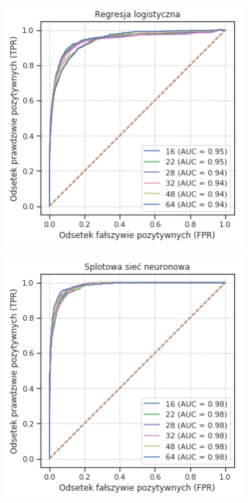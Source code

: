 \begin{figure}[h!]
  \centering
  \begin{subfigure}[b]{0.45\linewidth}
    \includegraphics[width=\linewidth]{images/logreg_patch_roc_v2}
  \end{subfigure}
  \begin{subfigure}[b]{0.45\linewidth}
    \includegraphics[width=\linewidth]{images/cnn_patch_roc_v2}
  \end{subfigure}
  \caption{}
  \label{fig:supervised_patches}
\end{figure}

